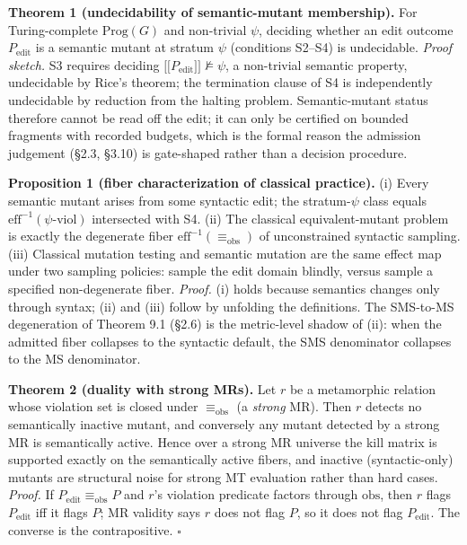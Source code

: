 \documentclass[manuscript,screen,review]{acmart}
\begin{document}
\textbf{Theorem 1 (undecidability of semantic-mutant membership).} For
Turing-complete $\mathrm{Prog}(G)$ and non-trivial $\psi$, deciding
whether an edit outcome $P_{\mathrm{edit}}$ is a semantic mutant at stratum $\psi$
(conditions S2--S4) is undecidable. \emph{Proof sketch.} S3 requires
deciding $\mathopen{\lbrack\!\lbrack} P_{\mathrm{edit}} \mathclose{\rbrack\!\rbrack} \not\models \psi$, a non-trivial
semantic property, undecidable by Rice's theorem; the termination clause
of S4 is independently undecidable by reduction from the halting
problem. Semantic-mutant status therefore cannot be read off the edit;
it can only be certified on bounded fragments with recorded budgets,
which is the formal reason the admission judgement (§2.3, §3.10) is
gate-shaped rather than a decision procedure.

\textbf{Proposition 1 (fiber characterization of classical practice).}
(i) Every semantic mutant arises from some syntactic edit; the
stratum-$\psi$ class equals $\mathrm{eff}^{-1}(\psi\text{-viol})$ intersected
with S4. (ii) The classical equivalent-mutant problem is exactly the
degenerate fiber $\mathrm{eff}^{-1}(\equiv_{\mathrm{obs}})$ of unconstrained syntactic
sampling. (iii) Classical mutation testing and semantic mutation are the
same effect map under two sampling policies: sample the edit domain
blindly, versus sample a specified non-degenerate fiber. \emph{Proof.}
(i) holds because semantics changes only through syntax; (ii) and (iii)
follow by unfolding the definitions. The SMS-to-MS degeneration of
Theorem 9.1 (§2.6) is the metric-level shadow of (ii): when the admitted
fiber collapses to the syntactic default, the SMS denominator collapses
to the MS denominator.

\textbf{Theorem 2 (duality with strong MRs).} Let $r$ be a
metamorphic relation whose violation set is closed under $\equiv_{\mathrm{obs}}$
(a \emph{strong} MR). Then $r$ detects no semantically inactive
mutant, and conversely any mutant detected by a strong MR is
semantically active. Hence over a strong MR universe the kill matrix
is supported exactly on the semantically active fibers, and inactive
(syntactic-only) mutants are structural noise for strong MT evaluation
rather than hard cases. \emph{Proof.} If $P_{\mathrm{edit}} \equiv_{\mathrm{obs}} P$ and $r$'s
violation predicate factors through $\mathrm{obs}$, then $r$ flags $P_{\mathrm{edit}}$ iff
it flags $P$; MR validity says $r$ does not flag $P$, so it does not
flag $P_{\mathrm{edit}}$. The converse is the contrapositive. $\square$
\end{document}
